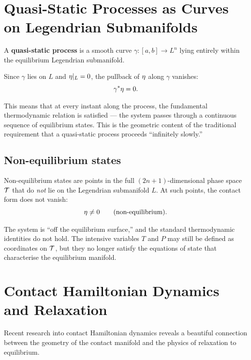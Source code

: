 \section{Quasi-Static Processes as Curves on Legendrian Submanifolds}

\begin{definition}
A \textbf{quasi-static process} is a smooth curve $\gamma: [a, b] \to L^n$ lying entirely within the equilibrium Legendrian submanifold.
\end{definition}

Since $\gamma$ lies on $L$ and $\eta|_L = 0$, the pullback of $\eta$ along $\gamma$ vanishes:
\begin{equation}
\gamma^*\eta = 0.
\end{equation}

This means that at every instant along the process, the fundamental thermodynamic relation is satisfied --- the system passes through a continuous sequence of equilibrium states. This is the geometric content of the traditional requirement that a quasi-static process proceeds ``infinitely slowly.''

\subsection{Non-equilibrium states}

Non-equilibrium states are points in the full $(2n+1)$-dimensional phase space $\mathcal{T}$ that do \emph{not} lie on the Legendrian submanifold $L$. At such points, the contact form does not vanish:
\begin{equation}
\eta \neq 0 \qquad \text{(non-equilibrium)}.
\end{equation}

The system is ``off the equilibrium surface,'' and the standard thermodynamic identities do not hold. The intensive variables $T$ and $P$ may still be defined as coordinates on $\mathcal{T}$, but they no longer satisfy the equations of state that characterise the equilibrium manifold.

\section{Contact Hamiltonian Dynamics and Relaxation}

Recent research into contact Hamiltonian dynamics reveals a beautiful connection between the geometry of the contact manifold and the physics of relaxation to equilibrium.

